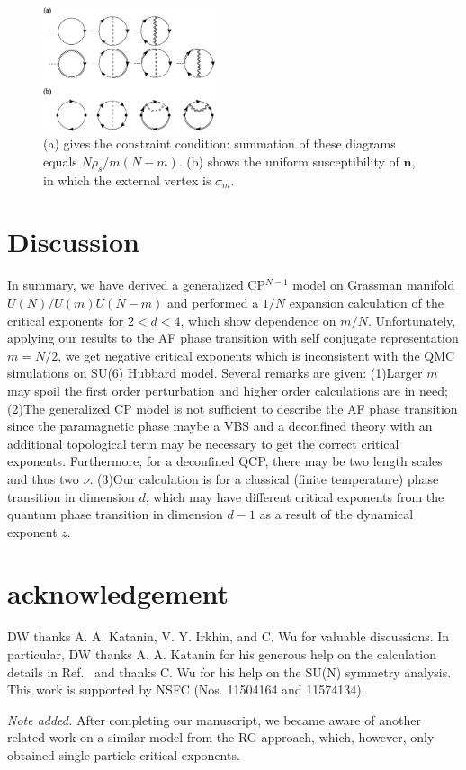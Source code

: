 \documentclass[aps,twocolumn,superscriptaddress]{revtex4-1}
\newcommand{\bn}{\mathbf{n}}
\begin{document}
\begin{figure}
\includegraphics[width=0.45\textwidth]{suscept.eps}
\caption{\label{fig:suscept} (a) gives the constraint condition: summation of these diagrams equals $N\rho_s/m(N-m)$. (b) shows the uniform susceptibility of $\bn$, in which the external vertex is $\sigma_m$. }
\end{figure}

\section{Discussion}
In summary, we have derived a generalized CP$^{N-1}$ model on Grassman manifold $U(N)/U(m)U(N-m)$ and performed a $1/N$
expansion calculation of the critical exponents for $2<d<4$, which show dependence on $m/N$. Unfortunately, applying our
results to the AF phase transition with self conjugate representation $m=N/2$, we get negative critical exponents which
is inconsistent with the QMC simulations on SU(6) Hubbard model. \cite{wang2014,wang2018} Several remarks are given: (1)Larger $m$ may spoil the
first order perturbation and higher order calculations are in need; (2)The generalized CP model is not sufficient to
describe the AF phase transition since the paramagnetic phase maybe a VBS and a deconfined theory with an additional
topological term may be necessary to get the correct critical exponents. \cite{senthil2004,motrunich2004} 
Furthermore, for a deconfined QCP, there may be two
length scales and thus two $\nu$. \cite{Shao2016} (3)Our calculation is for a classical (finite temperature) phase
transition in dimension $d$, which may have different critical exponents from the quantum phase transition in dimension
$d-1$ as a result of the dynamical exponent $z$. \cite{sondhi1997}


\section{acknowledgement}
DW thanks A. A. Katanin, V. Y. Irkhin, and C. Wu for valuable discussions. In particular, DW thanks A. A. Katanin for his generous help on the calculation details in Ref.~ and thanks C. Wu for his help on the SU(N) symmetry analysis. This work is supported by NSFC (Nos. 11504164 and 11574134).

{\it Note added.} After completing our manuscript, we became aware of another related work \cite{das2018} on a similar model from the RG approach, which, however, only obtained single particle critical exponents. 



\end{document}
